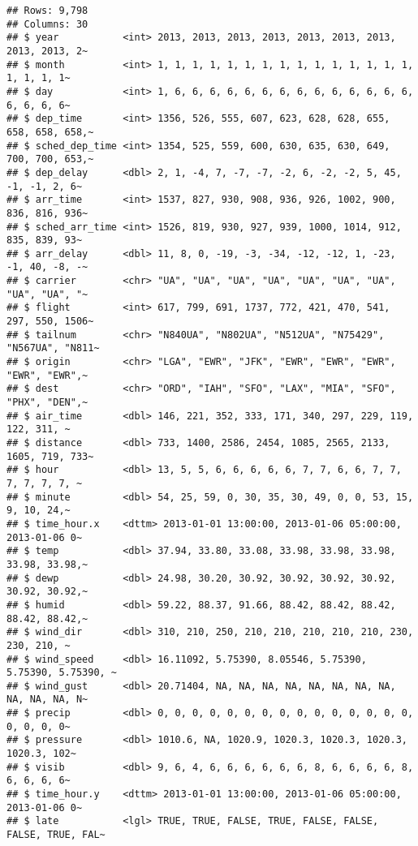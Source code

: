 \documentclass[
]{article}
\begin{document}
\begin{verbatim}
## Rows: 9,798
## Columns: 30
## $ year           <int> 2013, 2013, 2013, 2013, 2013, 2013, 2013, 2013, 2013, 2~
## $ month          <int> 1, 1, 1, 1, 1, 1, 1, 1, 1, 1, 1, 1, 1, 1, 1, 1, 1, 1, 1~
## $ day            <int> 1, 6, 6, 6, 6, 6, 6, 6, 6, 6, 6, 6, 6, 6, 6, 6, 6, 6, 6~
## $ dep_time       <int> 1356, 526, 555, 607, 623, 628, 628, 655, 658, 658, 658,~
## $ sched_dep_time <int> 1354, 525, 559, 600, 630, 635, 630, 649, 700, 700, 653,~
## $ dep_delay      <dbl> 2, 1, -4, 7, -7, -7, -2, 6, -2, -2, 5, 45, -1, -1, 2, 6~
## $ arr_time       <int> 1537, 827, 930, 908, 936, 926, 1002, 900, 836, 816, 936~
## $ sched_arr_time <int> 1526, 819, 930, 927, 939, 1000, 1014, 912, 835, 839, 93~
## $ arr_delay      <dbl> 11, 8, 0, -19, -3, -34, -12, -12, 1, -23, -1, 40, -8, -~
## $ carrier        <chr> "UA", "UA", "UA", "UA", "UA", "UA", "UA", "UA", "UA", "~
## $ flight         <int> 617, 799, 691, 1737, 772, 421, 470, 541, 297, 550, 1506~
## $ tailnum        <chr> "N840UA", "N802UA", "N512UA", "N75429", "N567UA", "N811~
## $ origin         <chr> "LGA", "EWR", "JFK", "EWR", "EWR", "EWR", "EWR", "EWR",~
## $ dest           <chr> "ORD", "IAH", "SFO", "LAX", "MIA", "SFO", "PHX", "DEN",~
## $ air_time       <dbl> 146, 221, 352, 333, 171, 340, 297, 229, 119, 122, 311, ~
## $ distance       <dbl> 733, 1400, 2586, 2454, 1085, 2565, 2133, 1605, 719, 733~
## $ hour           <dbl> 13, 5, 5, 6, 6, 6, 6, 6, 7, 7, 6, 6, 7, 7, 7, 7, 7, 7, ~
## $ minute         <dbl> 54, 25, 59, 0, 30, 35, 30, 49, 0, 0, 53, 15, 9, 10, 24,~
## $ time_hour.x    <dttm> 2013-01-01 13:00:00, 2013-01-06 05:00:00, 2013-01-06 0~
## $ temp           <dbl> 37.94, 33.80, 33.08, 33.98, 33.98, 33.98, 33.98, 33.98,~
## $ dewp           <dbl> 24.98, 30.20, 30.92, 30.92, 30.92, 30.92, 30.92, 30.92,~
## $ humid          <dbl> 59.22, 88.37, 91.66, 88.42, 88.42, 88.42, 88.42, 88.42,~
## $ wind_dir       <dbl> 310, 210, 250, 210, 210, 210, 210, 210, 230, 230, 210, ~
## $ wind_speed     <dbl> 16.11092, 5.75390, 8.05546, 5.75390, 5.75390, 5.75390, ~
## $ wind_gust      <dbl> 20.71404, NA, NA, NA, NA, NA, NA, NA, NA, NA, NA, NA, N~
## $ precip         <dbl> 0, 0, 0, 0, 0, 0, 0, 0, 0, 0, 0, 0, 0, 0, 0, 0, 0, 0, 0~
## $ pressure       <dbl> 1010.6, NA, 1020.9, 1020.3, 1020.3, 1020.3, 1020.3, 102~
## $ visib          <dbl> 9, 6, 4, 6, 6, 6, 6, 6, 6, 8, 6, 6, 6, 6, 8, 6, 6, 6, 6~
## $ time_hour.y    <dttm> 2013-01-01 13:00:00, 2013-01-06 05:00:00, 2013-01-06 0~
## $ late           <lgl> TRUE, TRUE, FALSE, TRUE, FALSE, FALSE, FALSE, TRUE, FAL~
\end{verbatim}
\end{document}
